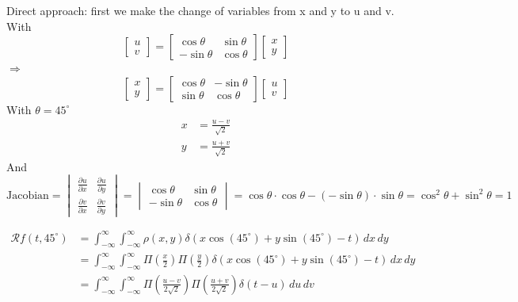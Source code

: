 \documentclass[12pt,twoside]{article}
\begin{document}
\begin{enumerate}
        Direct approach:  first  we make the change of variables from x and y to u and v.
        With 
        \[
        \begin{bmatrix}
		u \\
		v
	\end{bmatrix}
	=
	\begin{bmatrix}
	\cos\theta & \sin\theta \\
	-\sin\theta & \cos\theta
	\end{bmatrix}   \begin{bmatrix}
		x \\
		y
	\end{bmatrix}
        \]  $\Rightarrow$
        \[
        \begin{bmatrix}
		x \\
		y
	\end{bmatrix}
	=
	\begin{bmatrix}
	\cos\theta & -\sin\theta \\
	\sin\theta & \cos\theta
	\end{bmatrix}   \begin{bmatrix}
		u \\
		v
	\end{bmatrix}
        \] 
        With $\theta=45^{\circ}$
        	 \begin{align*}
	 	x &= \frac{u-v}{\sqrt{2}} \\
	 	y &= \frac{u+v}{\sqrt{2}}
	 \end{align*}
	And
\[
\text{Jacobian} =
\begin{vmatrix}
\frac{\partial u}{\partial x} & \frac{\partial u}{\partial y} \\
\frac{\partial v}{\partial x} & \frac{\partial v}{\partial y}
\end{vmatrix}
=
\begin{vmatrix}
\cos\theta & \sin\theta \\
-\sin\theta & \cos\theta
\end{vmatrix}
= \cos\theta \cdot \cos\theta - (-\sin\theta) \cdot \sin\theta
= \cos^2\theta + \sin^2\theta = 1
\]

\begin{align*}
	\mathcal{R}f(t, 45^{\circ}) &= \int_{-\infty}^{\infty} \int_{-\infty}^{\infty} \rho(x, y) \delta(x \cos(45^\circ) + y \sin(45^\circ) - t) \, dx \, dy \\
	&= \int_{-\infty}^{\infty} \int_{-\infty}^{\infty} \Pi\left(\frac{x}{2}\right) \Pi\left(\frac{y}{2}\right) \delta\left(x \cos(45^\circ) + y \sin(45^\circ) - t\right) \, dx \, dy \\
	&= \int_{-\infty}^{\infty} \int_{-\infty}^{\infty} \Pi\left(\frac{u-v}{2 \sqrt{2}}\right) \Pi\left(\frac{u+v}{2 \sqrt{2}}\right) \delta\left(t - u\right) \, du \, dv
\end{align*}


\end{enumerate}
\end{document}
